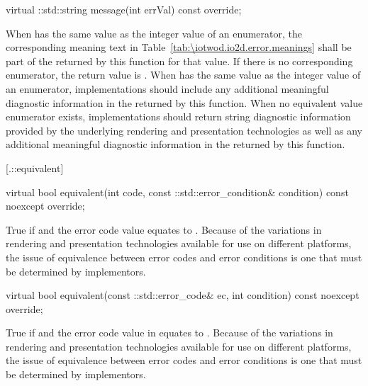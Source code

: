 %
%
\begin{itemdecl}
virtual ::std::string message(int errVal) const override;
\end{itemdecl}
\begin{itemdescr}
	\pnum
	\returns
	When  has the same value as the integer value of an 
	 enumerator, the corresponding meaning text in 
	Table~\ref{tab:\iotwod.io2d.error.meanings} shall be part of the 
	 returned by this function for that value. If there is no 
	corresponding enumerator, the return value is 
	.
	\enternote
	When  has the same value as the integer value of an 
	 enumerator, implementations should include any 
	additional meaningful diagnostic information in the  returned 
	by this function. When no equivalent value enumerator exists, 
	implementations should return string diagnostic information provided by the 
	underlying rendering and presentation technologies as well as any 
	additional meaningful diagnostic information in the  returned 
	by this function.
	\exitnote
	
\end{itemdescr}

 [\iotwod.\iotwoderrorcategory::equivalent] 
{}

%
%
\begin{itemdecl}
virtual bool equivalent(int code,
  const ::std::error_condition& condition) const noexcept override;
\end{itemdecl}
\begin{itemdescr}
	\pnum
	\returns
	True if  and the  error code value  equates to .
	\enternote
	Because of the variations in rendering and presentation technologies 
	available for use on different platforms, the issue of equivalence between 
	error codes and error conditions is one that must be determined by 
	implementors.
	\exitnote
\end{itemdescr}
\begin{itemdecl}
virtual bool equivalent(const ::std::error_code& ec,
  int condition) const noexcept override;
\end{itemdecl}
\begin{itemdescr}
	\pnum
	\returns
	True if  and the  error code value in  equates to .
	\enternote
	Because of the variations in rendering and presentation technologies 
	available for use on different platforms, the issue of equivalence between 
	error codes and error conditions is one that must be determined by 
	implementors.
	\exitnote
\end{itemdescr}

